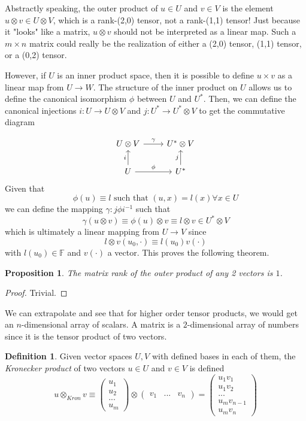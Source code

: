 \documentclass{article}
\newtheorem{proposition}[theorem]{Proposition}
\theoremstyle{remark}
\theoremstyle{definition}
\newtheorem{definition}{Definition}[section]
\begin{document}
Abstractly speaking, the outer product of $u \in U$ and $v \in V$ is the element $u \otimes v \in U \otimes V$, which is a rank-(2,0) tensor, not a rank-(1,1) tensor! Just because it "looks" like a matrix, $u \otimes v$ should not be interpreted as a linear map. Such a $m \times n$ matrix could really be the realization of either a (2,0) tensor, (1,1) tensor, or a (0,2) tensor. 

However, if $U$ is an inner product space, then it is possible to define $u \times v$ as a linear map from $U \longrightarrow W$. The structure of the inner product on $U$ allows us to define the canonical isomorphism $\phi$ between $U$ and $U^*$. Then, we can define the canonical injections $i: U \longrightarrow U \otimes V$ and $j: U^* \longrightarrow U^* \otimes V$ to get the commutative diagram 

\[\begin{tikzcd}
    U \otimes V \arrow{r}{\gamma} & U^* \otimes V \\
    U \arrow{u}{i} \arrow{r}{\phi} & U^* \arrow{u}{j}
\end{tikzcd}\]
Given that 
\[\phi(u) \equiv l \text{ such that } (u, x) = l(x) \forall x \in U\]
we can define the mapping $\gamma: j \phi i^{-1}$ such that 
\[\gamma (u \otimes v) \equiv \phi(u) \otimes v \equiv l \otimes v \in U^* \otimes V\]
which is ultimately a linear mapping from $U \longrightarrow V$ since
\[l \otimes v (u_0, \cdot) \equiv l(u_0) v(\cdot)\]
with $l(u_0) \in \mathbb{F}$ and $v(\cdot)$ a vector. This proves the following theorem. 

\begin{proposition}
The matrix rank of the outer product of any 2 vectors is $1$. 
\end{proposition}
\begin{proof}
Trivial.
\end{proof}

We can extrapolate and see that for higher order tensor products, we would get an $n$-dimensional array of scalars. A matrix is a $2$-dimensional array of numbers since it is the tensor product of two vectors. 

\begin{definition}
Given vector spaces $U, V$ with defined bases in each of them, the \textit{Kronecker product} of two vectors $u \in U$ and $v \in V$ is defined
\[u \otimes_{Kron} v \equiv \begin{pmatrix}
u_1 \\ u_2 \\ ... \\ u_m
\end{pmatrix} \otimes \begin{pmatrix}
v_1 & ... & v_n
\end{pmatrix} = \begin{pmatrix}
u_1 v_1 \\ u_1 v_2 \\ ... \\ u_m v_{n-1} \\ u_m v_n 
\end{pmatrix}\]
\end{definition}
\end{document}

